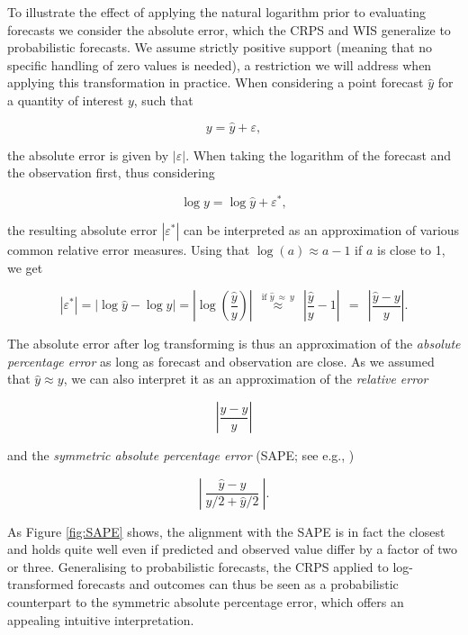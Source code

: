 \documentclass{article}
\begin{document}
To illustrate the effect of applying the natural logarithm prior to evaluating forecasts we consider the absolute error, which the CRPS and WIS generalize to probabilistic forecasts. We assume strictly positive support (meaning that no specific handling of zero values is needed), a restriction we will address when applying this transformation in practice. When considering a point forecast $\hat{y}$ for a quantity of interest $y$, such that 
%
\begin{linenomath*}
\begin{equation}
y = \hat{y} + \varepsilon,
\end{equation}
\end{linenomath*}
the absolute error is given by $|\varepsilon|$. When taking the logarithm of the forecast and the observation first, thus considering 
\begin{linenomath*}
\begin{equation}
\log y = \log \hat{y} + \varepsilon^*,
\end{equation}
\end{linenomath*}
the resulting absolute error $\left|\varepsilon^*\right|$ can be interpreted as an approximation of various common relative error measures. Using that $\log(a) \approx a - 1$ if $a$ is close to 1, we get
\begin{linenomath*}
\begin{equation}
|\varepsilon^*| = |\log \hat{y} - \log y| = \left|\log\left(\frac{\hat{y}}{y}\right) \right| \ \ \stackrel{\text{if } \hat{y} \ \approx \ y}{\approx} \ \ \left| \frac{\hat{y}}{y} - 1 \right| \ \ = \ \ \left| \frac{\hat{y} - y}{y} \right|.
\end{equation}
\end{linenomath*}
The absolute error after log transforming is thus an approximation of the \textit{absolute percentage error} \citep[APE,][]{gneitingMakingEvaluatingPoint2011a} as long as forecast and observation are close. As we assumed that $\hat{y} \approx y$, we can also interpret it as an approximation of the \textit{relative error} \citep[RE,][]{gneitingMakingEvaluatingPoint2011a}
\begin{linenomath*}
\begin{equation}
\left| \frac{\hat{y} - y}{\hat{y}} \right|
\end{equation}
\end{linenomath*}
and the \textit{symmetric absolute percentage error} (SAPE; see e.g., \citealt{Flores1986})
\begin{linenomath*}
\begin{equation}
\left| \ \frac{\hat{y} - y}{y/2 + \hat{y}/2} \ \right|.
\end{equation}
\end{linenomath*}
As Figure \ref{fig:SAPE} shows, the alignment with the SAPE is in fact the closest and holds quite well even if predicted and observed value differ by a factor of two or three. Generalising to probabilistic forecasts, the CRPS applied to log-transformed forecasts and outcomes can thus be seen as a probabilistic counterpart to the symmetric absolute percentage error, which offers an appealing intuitive interpretation.
\end{document}
